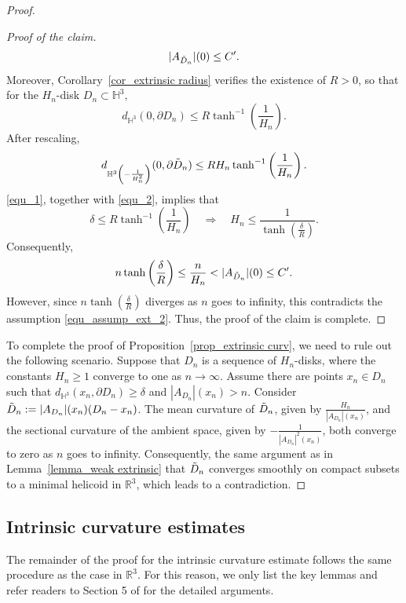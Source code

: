 \documentclass[12pt,a4paper]{amsart}
\numberwithin{equation}{section}
\theoremstyle{plain}
\theoremstyle{named}
\theoremstyle{definition}
\begin{document}
\begin{proof}
\begin{proof}[Proof of the claim]
\begin{equation*}
    |A_{\Tilde{D}_n}|(0)\leq C'.
\end{equation*}
Moreover, Corollary~\ref{cor_extrinsic radius} verifies the existence of $R>0$, so that for the $H_n$-disk $D_n\subset \mathbb{H}^3$, \begin{equation*}
    d_{\mathbb{H}^3}(0,\partial D_n)\leq R \tanh^{-1}\left(\frac{1}{H_n}\right).
\end{equation*}
After rescaling, 
\begin{equation}\label{equ_2}
    d_{\mathbb{H}^3\left(-\frac{1}{H_n^2}\right)}(0,\partial \Tilde{D}_n)\leq RH_n \tanh^{-1}\left(\frac{1}{H_n}\right).
\end{equation}
\eqref{equ_1}, together with \eqref{equ_2}, implies that \begin{equation*}
    \delta\leq R\tanh^{-1}\left(\frac{1}{H_n}\right)\quad \Longrightarrow\quad H_n\leq \frac{1}{\tanh\left(\frac{\delta}{R}\right)}.
\end{equation*}
Consequently, \begin{equation*}
    n\tanh\left(\frac{\delta}{R}\right)\leq \frac{n}{H_n}<|A_{\Tilde{D}_n}|(0)\leq C'.
\end{equation*}
However, since $n\tanh\left(\frac{\delta}{R}\right)$ diverges as $n$ goes to infinity, this contradicts the assumption \eqref{equ_assump_ext_2}. Thus, the proof of the claim is complete.
\end{proof}

To complete the proof of Proposition~\ref{prop_extrinsic curv}, we need to rule out the following scenario. Suppose that $D_n$ is a sequence of $H_n$-disks, where the constants $H_n\geq 1$ converge to one as $n\rightarrow\infty$. Assume there are points $x_n\in D_n$ such that $d_{\mathbb{H}^3}(x_n,\partial D_n)\geq \delta$ and $|A_{D_n}|(x_n)>n$. Consider $\Tilde{D}_n:=|A_{D_n}|(x_n)(D_n-x_n)$. The mean curvature of $\Tilde{D}_n$, given by $\frac{H_n}{|A_{D_n}|(x_n)}$, and the sectional curvature of the ambient space, given by $-\frac{1}{|A_{D_n}|^2(x_n)}$, both converge to zero as $n$ goes to infinity. Consequently, the same argument as in Lemma~\ref{lemma_weak extrinsic} that $\Tilde{D}_n$ converges smoothly on compact subsets to a minimal helicoid in $\mathbb{R}^3$, which leads to a contradiction.
\end{proof}



\subsection{Intrinsic curvature estimates}\label{subsection_intrinsic}
The remainder of the proof for the intrinsic curvature estimate follows the same procedure as the case in $\mathbb{R}^3$. For this reason, we only list the key lemmas and refer readers to Section 5 of \cite{Tinaglia_review} for the detailed arguments.
\end{document}
